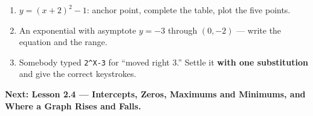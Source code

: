 \documentclass[aspectratio=169, 11pt]{beamer}
\begin{document}
\begin{frame}[t, plain]
  \begin{enumerate}
    \setlength{\itemsep}{0.3cm}
    \item $y=(x+2)^2-1$: anchor point, complete the table, plot the five points.
    \item An exponential with asymptote $y=-3$ through $(0,-2)$ --- write the equation and the range.
    \item Somebody typed \texttt{2\^{}X-3} for ``moved right 3.'' Settle it \textbf{with one
          substitution} and give the correct keystrokes.
  \end{enumerate}
  \vspace{0.25cm}
  {\color{royal}\bfseries Next: Lesson 2.4 --- Intercepts, Zeros, Maximums and Minimums, and Where a
  Graph Rises and Falls.}
\end{frame}
\end{document}
